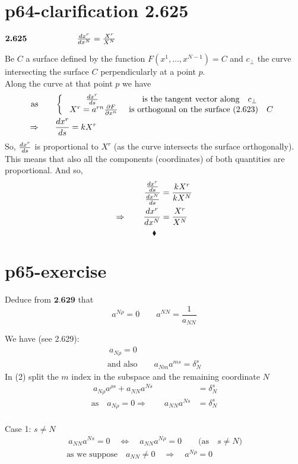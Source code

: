\section{p64-clarification 2.625}
\begin{tcolorbox}
$\textbf{2.625} \quad\quad\quad\quad\quad\quad \dv{ x^r}{x^N} = \frac{X^r}{X^N}$
\end{tcolorbox}
Be $C$ a surface defined by the function $F(x^1,\dots, x^{N-1}) = C$ and  $c_{\perp}$ the curve intersecting the surface $C$ perpendicularly at a point $p$.\\
Along the curve at that point $p$ we have
\begin{align}
\text{as}\quad\quad & \left \{ \begin{array}{cc}
\dv{ x^r}{s}& \text{is the tangent vector along}\quad c_{\perp}\\
\ X^r = a^{rn}\pdv{F}{x^n}& \text{ is orthogonal on the surface (2.623)}\quad C\\
\end{array}\right.\\
\Rightarrow \quad\quad & \dv{ x^r}{s} = kX^r
\end{align}
So, $\dv{ x^r}{s}$ is proportional to $X^r$ (as the curve intersects the surface orthogonally). This means that also all the components (coordinates) of both quantities are proportional. And so,
\begin{align}
\frac{\dv{ x^r}{s}}{\dv{ x^N}{s}} &= \frac{kX^r}{kX^N}\\
\Rightarrow\quad\quad \dv{ x^r}{x^N} &= \frac{X^r}{X^N}
\end{align}
$$\blacklozenge$$
\newpage

\section{p65-exercise}
\begin{tcolorbox}
Deduce from $\textbf{2.629}$ that $$a^{N \rho} = 0  \quad\quad a^{NN} = \frac{1}{a_{NN}}$$
\end{tcolorbox}
We have (see 2.629):
\begin{align}
\ a_{N\rho} =0\\
\text{and also}\quad\quad a_{Nm}a^{ms} = \delta^s_N
\end{align}
In (2) split the $m$ index in the subspace and the remaining coordinate $N$
\begin{align}
\ a_{N\rho}a^{\rho s} +  a_{NN}a^{N s} &= \delta^s_N\\
\text{as}\quad a_{N\rho} =0 \Rightarrow \quad\quad a_{NN}a^{N s} &= \delta^s_N
\end{align}\\
Case 1: $s\ne N$
\begin{align}
\  a_{NN}a^{N s} =0 \quad \Leftrightarrow \quad a_{NN}a^{N \rho} =0 \quad\quad \text{(as}\quad s\ne N \text{)}\\
\text{as we suppose}\quad a_{NN}\ne 0 \quad \Rightarrow \quad a^{N \rho} =0
\end{align}\\

